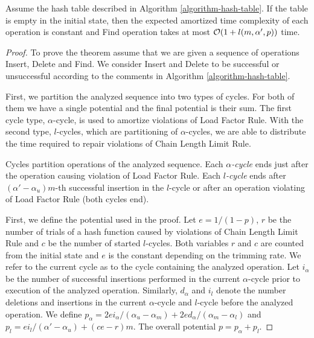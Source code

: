 \begin{theorem}
\label{theorem-amortised-expected-time}
Assume the hash table described in Algorithm \ref{algorithm-hash-table}. 
If the table is empty in the initial state, then the expected amortized time complexity of each operation is constant and Find operation takes at most $\mathcal{O}(1 + l(m, \alpha', p))$ time.
\end{theorem}
\begin{proof}
To prove the theorem assume that we are given a sequence of operations Insert, Delete and Find. 
We consider Insert and Delete to be successful or unsuccessful according to the comments in Algorithm \ref{algorithm-hash-table}.

First, we partition the analyzed sequence into two types of cycles. 
For both of them we have a single potential and the final potential is their sum.
The first cycle type, $\alpha$-cycle, is used to amortize violations of Load Factor Rule. 
With the second type, $l$-cycles, which are partitioning of $\alpha$-cycles, we are able to distribute the time required to repair violations of Chain Length Limit Rule.

\begin{definition}
Cycles partition operations of the analyzed sequence.
Each \emph{$\alpha$-cycle} ends just after the operation causing violation of Load Factor Rule.
Each \emph{$l$-cycle} ends after $(\alpha'-\alpha_u)m$-th successful insertion in the $l$-cycle or after an operation violating of Load Factor Rule (both cycles end).
\end{definition}

First, we define the potential used in the proof.
Let $e = 1/(1 - p)$, $r$ be the number of trials of a hash function caused by violations of Chain Length Limit Rule and $c$ be the number of started $l$-cycles.
Both variables $r$ and $c$ are counted from the initial state and $e$ is the constant depending on the trimming rate.
We refer to the current cycle as to the cycle containing the analyzed operation.
Let $i_\alpha$ be the number of successful insertions performed in the current $\alpha$-cycle prior to execution of the analyzed operation.
Similarly, $d_\alpha$ and $i_l$ denote the number deletions and insertions in the current $\alpha$-cycle and $l$-cycle before the analyzed operation.
We define $p_\alpha = {2ei_{\alpha}}/{(\alpha_u - \alpha_m)} + {2ed_{\alpha}}/{(\alpha_m - \alpha_l)}$ and $p_l = {ei_{l}}/{(\alpha' - \alpha_u)} + (ce - r) m$.
The overall potential $p = p_\alpha + p_l$.


\end{proof}

